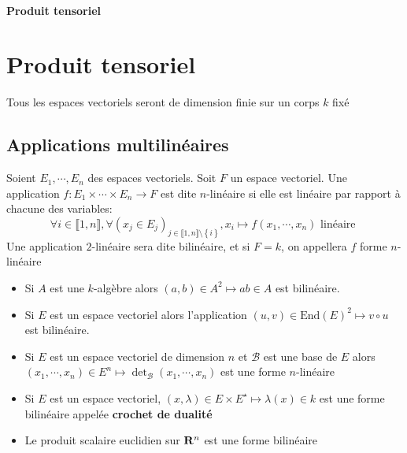 \ifsolo
    ~

    \vspace{1cm}

    \begin{center}
        \textbf{\LARGE Produit tensoriel} \\[1em]
    \end{center}
    \tableofcontents
\else
    \chapter{Produit tensoriel}

    \minitoc
\fi
\thispagestyle{empty}

Tous les espaces vectoriels seront de dimension finie sur un corps $k$ fixé

\section{Applications multilinéaires}

\begin{dfn}
    Soient $E_1, \cdots , E_n$ des espaces vectoriels. Soit $F$ un espace vectoriel. Une application  $f:E_1\times \cdots \times E_n \longrightarrow F$ est dite $n$-linéaire si elle est linéaire par rapport à chacune des variables: \[
    \forall  i \in  \llbracket 1, n \rrbracket , \forall  (x_j \in E_j)_{j \in  \llbracket 1, n \rrbracket \setminus \left\{ i \right\} }, x_i \longmapsto f(x_1, \cdots , x_n) \text{ linéaire }
\] 
Une application $2$-linéaire sera dite bilinéaire, et si $F=k$, on appellera $f$ forme  $n$-linéaire
\end{dfn}

\begin{ex}
\begin{itemize}
    \item Si $A$ est une  $k$-algèbre alors $(a, b) \in  A^2 \longmapsto ab \in  A$ est bilinéaire.
    \item Si $E$ est un espace vectoriel alors l'application $(u, v) \in  \mathrm{End}(E)^2 \longmapsto  v\circ u$ est bilinéaire.
    \item Si $E$ est un espace vectoriel de dimension $n$ et  $\mathcal  B$ est une base de $E$ alors $(x_1, \cdots , x_n) \in  E^n \longmapsto \det_{\mathcal  B}(x_1, \cdots , x_n)$ est une forme $n$-linéaire
    \item Si  $E$ est un espace vectoriel,  $(x, \lambda) \in  E\times E^\star \longmapsto \lambda(x) \in  k$ est une forme bilinéaire appelée \textbf{crochet de dualité}
    \item Le produit scalaire euclidien sur $\mathbf R^n$ est une forme bilinéaire
\end{itemize}
\end{ex}

